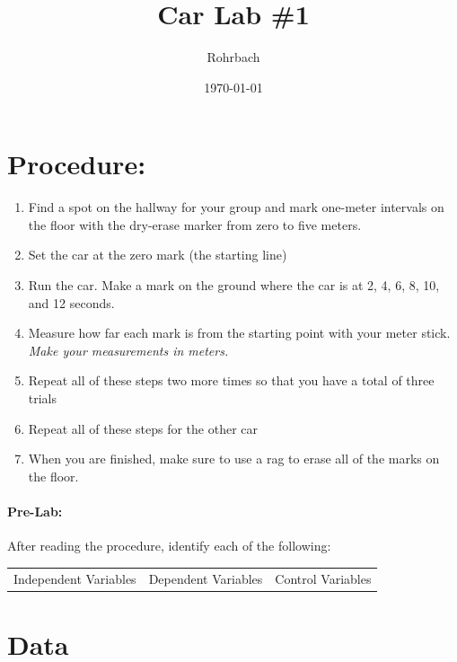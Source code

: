 \documentclass[10pt]{exam}
\title{Car Lab \#1}
\author{Rohrbach}
\date{\today}
\begin{document}
\maketitle

\vspace{-1em}
\section*{Procedure:}
  \begin{enumerate}[label=\alph*),topsep=0pt,itemsep=-1ex,partopsep=1ex,parsep=1ex]
    \item 
      Find a spot on the hallway for your group and mark one-meter intervals on the floor with the dry-erase marker from zero to five meters.
    \item 
      Set the car at the zero mark (the starting line)
    \item
      Run the car.  Make a mark on the ground where the car is at 2, 4, 6, 8, 10, and 12 seconds.
    \item
      Measure how far each mark is from the starting point with your meter stick.  \emph{Make your measurements in meters.}
    \item
      Repeat all of these steps two more times so that you have a total of three trials
    \item 
      Repeat all of these steps for the other car
    \item 
      When you are finished, make sure to use a rag to erase all of the marks on the floor.
  \end{enumerate}

  \paragraph{Pre-Lab:} After reading the procedure, identify each of the following:

    \begin{center}
      \begin{tabular}
        { m{} | m{}| m{} } 
        Independent Variables & 
        Dependent Variables   & 
        Control Variables  \\[6em]
      \end{tabular}
    \end{center}

\vspace{-2em}
\section*{Data}
\end{document}
